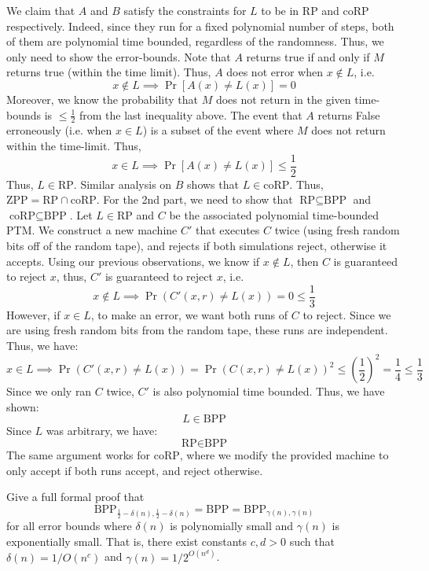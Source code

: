 \documentclass[12pt]{article}
\begin{document}
\begin{solution}
\begin{itemize}
    \end{itemize}
    We claim that $A$ and $B$ satisfy the constraints for $L$ to be in $\text{RP}$ and $\text{coRP}$ respectively. Indeed, since they run for a fixed polynomial number of steps, both of them are polynomial time bounded, regardless of the randomness. Thus, we only need to show the error-bounds. \bbni
    Note that $A$ returns true if and only if $M$ returns true (within the time limit). Thus, $A$ does not error when $x \not \in L$, i.e.
    \[ x \not \in L \implies \Pr[A(x) \neq L(x)] = 0 \]
    Moreover, we know the probability that $M$ does not return in the given time-bounds is $\leq \frac{1}{2}$ from the last inequality above. The event that $A$ returns False erroneously (i.e. when $x \in L$) is a subset of the event where $M$ does not return within the time-limit. Thus, 
    \[ x \in L \implies \Pr[A(x) \neq L(x)] \leq \frac{1}{2}\]
    Thus, $L \in \text{RP}$. Similar analysis on $B$ shows that $L \in \text{coRP}$. \bbni
    Thus, $\text{ZPP} = \text{RP} \cap \text{coRP}$. \bbni
    For the 2nd part, we need to show that $\text{RP} \subseteq \text{BPP}$ and $\text{coRP} \subseteq \text{BPP}$. \bbni
    Let $L \in \text{RP}$ and $C$ be the associated polynomial time-bounded PTM. We construct a new machine $C'$ that executes $C$ twice (using fresh random bits off of the random tape), and rejects if both simulations reject, otherwise it accepts. Using our previous observations, we know if $x \not \in L$, then $C$ is guaranteed to reject $x$, thus, $C'$ is guaranteed to reject $x$, i.e.
    \[x \not \in L \implies \Pr(C'(x, r) \neq L(x)) = 0 \leq \frac{1}{3} \] 
    However, if $x \in L$, to make an error, we want both runs of $C$ to reject. Since we are using fresh random bits from the random tape, these runs are independent. Thus, we have:
    \[ x \in L \implies \Pr(C'(x, r) \neq L(x)) = \Pr(C(x, r) \neq L(x))^2 \leq \left(\frac{1}{2}\right)^{2} = \frac{1}{4} \leq \frac{1}{3} \]
    Since we only ran $C$ twice, $C'$ is also polynomial time bounded. Thus, we have shown:
    \[ L \in \text{BPP} \]
    Since $L$ was arbitrary, we have:
    \[ \text{RP} \in \text{BPP} \]
    The same argument works for $\text{coRP}$, where we modify the provided machine to only accept if both runs accept, and reject otherwise.
\end{solution}

\newpage

\begin{problem}{13}
Give a full formal proof that
\[
\text{BPP}_{\frac{1}{2}-\delta(n), \frac{1}{2}-\delta(n)} = \text{BPP} = \text{BPP}_{\gamma(n), \gamma(n)}
\]
for all error bounds where \(\delta(n)\) is polynomially small and \(\gamma(n)\) is exponentially small.
That is, there exist constants \(c, d > 0\) such that \(\delta(n) = 1/O(n^c)\) and \(\gamma(n) = 1/2^{O(n^d)}\).
\end{problem}
\end{document}
